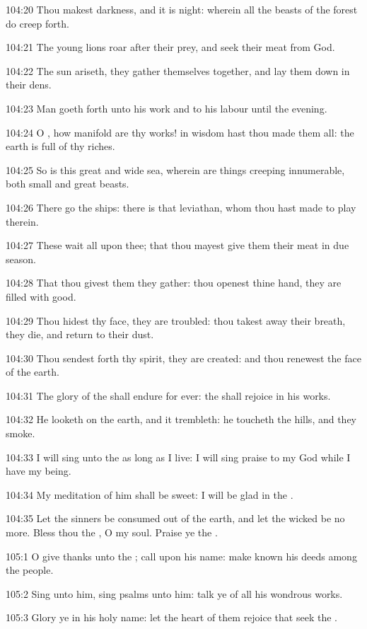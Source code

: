 104:20 Thou makest darkness, and it is night: wherein all the beasts of the forest do creep forth.

104:21 The young lions roar after their prey, and seek their meat from God.

104:22 The sun ariseth, they gather themselves together, and lay them down in their dens.

104:23 Man goeth forth unto his work and to his labour until the evening.

104:24 O \LORD, how manifold are thy works! in wisdom hast thou made them all: the earth is full of thy riches.

104:25 So is this great and wide sea, wherein are things creeping innumerable, both small and great beasts.

104:26 There go the ships: there is that leviathan, whom thou hast made to play therein.

104:27 These wait all upon thee; that thou mayest give them their meat in due season.

104:28 That thou givest them they gather: thou openest thine hand, they are filled with good.

104:29 Thou hidest thy face, they are troubled: thou takest away their breath, they die, and return to their dust.

104:30 Thou sendest forth thy spirit, they are created: and thou renewest the face of the earth.

104:31 The glory of the \LORD shall endure for ever: the \LORD shall rejoice in his works.

104:32 He looketh on the earth, and it trembleth: he toucheth the hills, and they smoke.

104:33 I will sing unto the \LORD as long as I live: I will sing praise to my God while I have my being.

104:34 My meditation of him shall be sweet: I will be glad in the \LORD.

104:35 Let the sinners be consumed out of the earth, and let the wicked be no more. Bless thou the \LORD, O my soul. Praise ye the \LORD.



105:1 O give thanks unto the \LORD; call upon his name: make known his deeds among the people.

105:2 Sing unto him, sing psalms unto him: talk ye of all his wondrous works.

105:3 Glory ye in his holy name: let the heart of them rejoice that seek the \LORD.

